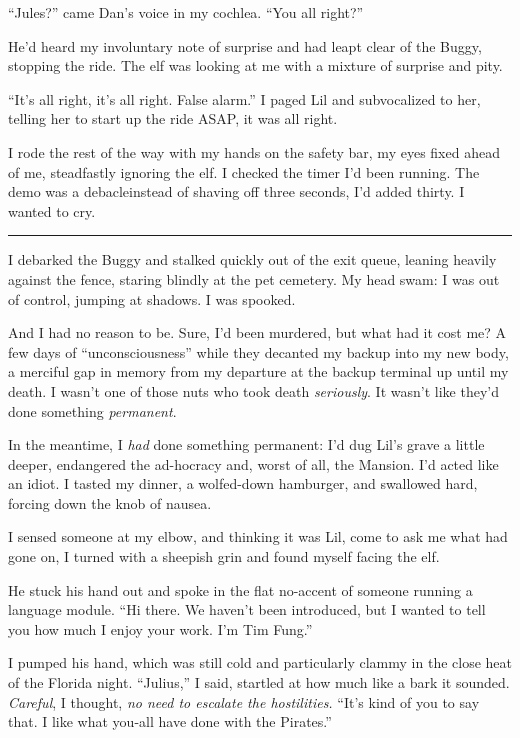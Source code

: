 “Jules?” came Dan's voice in my cochlea. “You all right?”

He'd heard my involuntary note of surprise and had leapt clear of
the Buggy, stopping the ride. The elf was looking at me with a
mixture of surprise and pity.

“It's all right, it's all right. False alarm.” I paged Lil and
subvocalized to her, telling her to start up the ride ASAP, it was
all right.

I rode the rest of the way with my hands on the safety bar, my eyes
fixed ahead of me, steadfastly ignoring the elf. I checked the
timer I'd been running. The demo was a debacle{\dash}instead of shaving
off three seconds, I'd added thirty. I wanted to cry.

\begin{center}\rule{1in}{0.4pt}\end{center}

I debarked the Buggy and stalked quickly out of the exit queue,
leaning heavily against the fence, staring blindly at the pet
cemetery. My head swam: I was out of control, jumping at shadows. I
was spooked.

And I had no reason to be. Sure, I'd been murdered, but what had it
cost me? A few days of “unconsciousness” while they decanted my
backup into my new body, a merciful gap in memory from my departure
at the backup terminal up until my death. I wasn't one of those
nuts who took death \emph{seriously}. It wasn't like they'd done
something \emph{permanent}.

In the meantime, I \emph{had} done something permanent: I'd dug
Lil's grave a little deeper, endangered the ad-hocracy and, worst
of all, the Mansion. I'd acted like an idiot. I tasted my dinner, a
wolfed-down hamburger, and swallowed hard, forcing down the knob of
nausea.

I sensed someone at my elbow, and thinking it was Lil, come to ask
me what had gone on, I turned with a sheepish grin and found myself
facing the elf.

He stuck his hand out and spoke in the flat no-accent of someone
running a language module. “Hi there. We haven't been introduced,
but I wanted to tell you how much I enjoy your work. I'm Tim
Fung.”

I pumped his hand, which was still cold and particularly clammy in
the close heat of the Florida night. “Julius,” I said, startled at
how much like a bark it sounded. \emph{Careful}, I thought,
\emph{no need to escalate the hostilities.} “It's kind of you to
say that. I like what you-all have done with the Pirates.”

